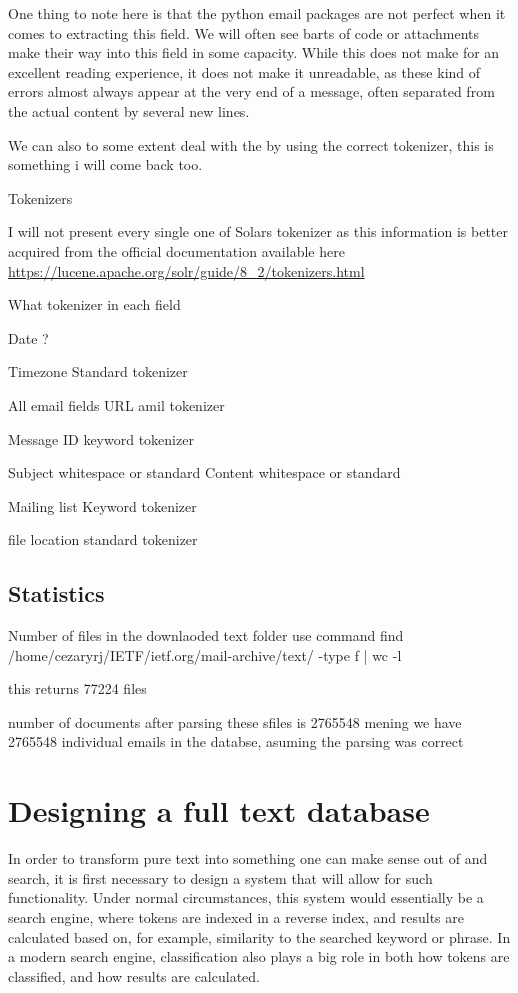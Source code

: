 \documentclass{report}
\begin{document}
One thing to note here is that the python email packages are not perfect when it comes to extracting this field. We will often see barts of code or attachments make their way into this field in some capacity. While this does not make for an excellent reading experience, it does not make it unreadable, as these kind of errors almost always appear at the very end of a message, often separated from the actual content by several new lines.

We can also to some extent deal with the by using the correct tokenizer, this is something i will come back too.


Tokenizers 

I will not present every single one of Solars tokenizer as this information is better acquired from the official documentation available here 
\url{https://lucene.apache.org/solr/guide/8_2/tokenizers.html}

What tokenizer in each field 

Date ?

Timezone
Standard tokenizer

All email fields
URL amil tokenizer

Message ID
keyword tokenizer

Subject
whitespace or standard
Content 
whitespace or standard

Mailing list 
Keyword tokenizer

file location
standard tokenizer










\section{Statistics}
Number of files in the downlaoded text folder 
use command 
find /home/cezaryrj/IETF/ietf.org/mail-archive/text/ -type f | wc -l

this returns 77224
files

number of documents after parsing these sfiles is 2765548
mening we have 2765548 individual emails in the databse, asuming the parsing was correct


\chapter{Designing a full text database}
In order to transform pure text into something one can make sense out of and search, it is first necessary to design a system that will allow for such functionality. Under normal circumstances, this system would essentially be a search engine, where tokens are indexed in a reverse index, and results are calculated based on, for example, similarity to the searched keyword or phrase. In a modern search engine, classification also plays a big role in both how tokens are classified, and how results are calculated.\\
\end{document}
